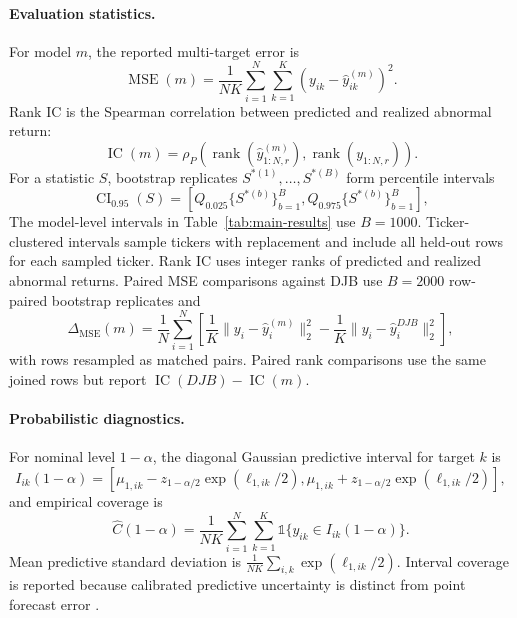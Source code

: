 \documentclass[10pt,letterpaper]{article}
\begin{document}
\paragraph{Evaluation statistics.}
For model \(m\), the reported multi-target error is
\begin{equation}
    \operatorname{MSE}(m)
    = \frac{1}{NK}\sum_{i=1}^{N}\sum_{k=1}^{K}
    \left(y_{ik}-\hat{y}^{(m)}_{ik}\right)^2 .
\end{equation}
Rank IC is the Spearman correlation between predicted and realized abnormal return:
\begin{equation}
    \operatorname{IC}(m)
    = \rho_P\left(
    \operatorname{rank}(\hat{y}^{(m)}_{1:N,r}),
    \operatorname{rank}(y_{1:N,r})
    \right).
\end{equation}
For a statistic \(S\), bootstrap replicates \(S^{*(1)},\ldots,S^{*(B)}\) form percentile
intervals
\begin{equation}
    \operatorname{CI}_{0.95}(S)
    =
    \left[Q_{0.025}\{S^{*(b)}\}_{b=1}^{B},
    Q_{0.975}\{S^{*(b)}\}_{b=1}^{B}\right],
\end{equation}
The model-level intervals in Table~\ref{tab:main-results} use \(B=1000\). Ticker-clustered
intervals sample tickers with replacement and include all held-out rows for each sampled ticker.
Rank IC uses integer ranks of predicted and realized abnormal returns. Paired MSE comparisons
against DJB use \(B=2000\) row-paired bootstrap replicates and
\begin{equation}
    \Delta_{\operatorname{MSE}}(m)
    = \frac{1}{N}\sum_{i=1}^{N}
    \left[
    \frac{1}{K}\lVert y_i-\hat{y}^{(m)}_i\rVert_2^2
    -
    \frac{1}{K}\lVert y_i-\hat{y}^{DJB}_i\rVert_2^2
    \right],
\end{equation}
with rows resampled as matched pairs. Paired rank comparisons use the same joined rows but report
\(\operatorname{IC}(DJB)-\operatorname{IC}(m)\).

\paragraph{Probabilistic diagnostics.}
For nominal level \(1-\alpha\), the diagonal Gaussian predictive interval for target \(k\) is
\begin{equation}
    I_{ik}(1-\alpha)
    =
    \left[
    \mu_{1,ik}-z_{1-\alpha/2}\exp(\ell_{1,ik}/2),
    \mu_{1,ik}+z_{1-\alpha/2}\exp(\ell_{1,ik}/2)
    \right],
\end{equation}
and empirical coverage is
\begin{equation}
    \widehat{C}(1-\alpha)
    = \frac{1}{NK}\sum_{i=1}^{N}\sum_{k=1}^{K}
    \mathbb{1}\{y_{ik}\in I_{ik}(1-\alpha)\}.
\end{equation}
Mean predictive standard deviation is
\(\frac{1}{NK}\sum_{i,k}\exp(\ell_{1,ik}/2)\). Interval coverage is reported because calibrated
predictive uncertainty is distinct from point forecast error
\citep{winkler1972score,gneiting2007strictly}.
\end{document}

